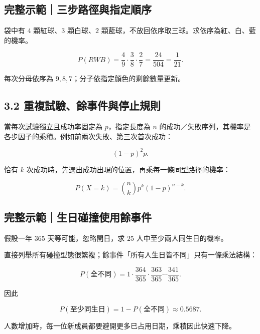 \documentclass[11pt,a4paper]{article}
\begin{document}
\begin{HandoutWorkedExample}

\subsection{完整示範｜三步路徑與指定順序}\label{ux5b8cux6574ux793aux7bc4ux4e09ux6b65ux8defux5f91ux8207ux6307ux5b9aux9806ux5e8f}

袋中有 \(4\) 顆紅球、\(3\) 顆白球、\(2\) 顆藍球，不放回依序取三球。求依序為紅、白、藍的機率。

\[
P(RWB)
=\frac49\cdot\frac38\cdot\frac27
=\frac{24}{504}
=\boxed{\frac1{21}}.
\]

每次分母依序為 \(9,8,7\)；分子依指定顏色的剩餘數量更新。

\end{HandoutWorkedExample}

\subsection{3.2 重複試驗、餘事件與停止規則}\label{ux91cdux8907ux8a66ux9a57ux9918ux4e8bux4ef6ux8207ux505cux6b62ux898fux5247}

當每次試驗獨立且成功率固定為 \(p\)，指定長度為 \(n\) 的成功／失敗序列，其機率是各步因子的乘積。例如前兩次失敗、第三次首次成功：

\[
(1-p)^2p.
\]

恰有 \(k\) 次成功時，先選出成功出現的位置，再乘每一條同型路徑的機率：

\[
P(X=k)=\binom nk p^k(1-p)^{n-k}.
\]

\begin{HandoutWorkedExample}

\subsection{完整示範｜生日碰撞使用餘事件}\label{ux5b8cux6574ux793aux7bc4ux751fux65e5ux78b0ux649eux4f7fux7528ux9918ux4e8bux4ef6}

假設一年 \(365\) 天等可能，忽略閏日，求 \(25\) 人中至少兩人同生日的機率。

直接列舉所有碰撞型態很繁複；餘事件「所有人生日皆不同」只有一條乘法結構：

\[
P(\text{全不同})
=1\cdot\frac{364}{365}\cdot\frac{363}{365}\cdots\frac{341}{365}.
\]

因此

\[
P(\text{至少同生日})
=1-P(\text{全不同})
\approx\boxed{0.5687}.
\]

人數增加時，每一位新成員都要避開更多已占用日期，乘積因此快速下降。

\end{HandoutWorkedExample}
\end{document}
